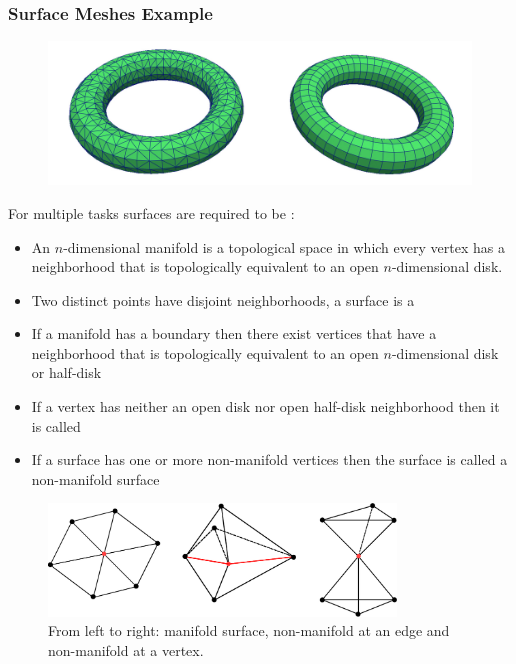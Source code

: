 \begin{frame}
\frametitle{Surface Meshes Example}

\begin{figure}[h!]
	\begin{center}
	   \includegraphics[width=\textwidth]{screenshots/tori.jpg}
	\end{center}
	\label{fig:tori}
\end{figure}
\end{frame}

\begin{frame}
For multiple tasks surfaces are required to be :
\begin{itemize}
\item An $n$-dimensional manifold is a topological space in which every vertex has a neighborhood that is topologically equivalent to an open $n$-dimensional disk. 
\item Two distinct points have disjoint neighborhoods, a surface is a  
\item If a manifold has a boundary then there exist vertices that have a neighborhood that is topologically equivalent to an open $n$-dimensional disk or half-disk
\item If a vertex has neither an open disk nor open half-disk neighborhood then it is called 
\item If a surface has one or more non-manifold vertices then the surface is called a non-manifold surface
\end{itemize}
\begin{figure}[h!]
\begin{center}
\includegraphics[height=3cm]{screenshots/non_manifolds.eps}
\end{center}
\caption{From left to right: manifold surface, non-manifold at an edge and non-manifold at a vertex.}
\label{fig:non-manifold}
\end{figure}
\end{frame}

